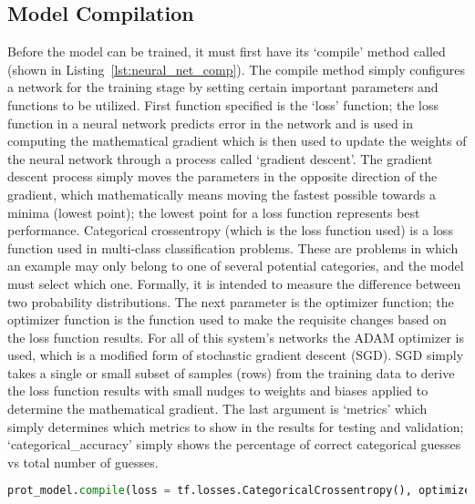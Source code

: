 \documentclass[12pt,letterpaper,oneside,reqno]{book}
\theoremstyle{plain}
\theoremstyle{definition}
\theoremstyle{plain}
\theoremstyle{remark}
\theoremstyle{plain}
\theoremstyle{definition}
\theoremstyle{plain}
\begin{document}
\subsection{Model Compilation}
Before the model can be trained, it must first have its `compile' method called (shown in Listing~\ref{lst:neural_net_comp}). The compile method simply configures a network for the training stage by setting certain important parameters and functions to be utilized. First function specified is the `loss' function; the loss function in a neural network predicts error in the network and is used in computing the mathematical gradient which is then used to update the weights of the neural network through a process called `gradient descent'. The gradient descent process simply moves the parameters in the opposite direction of the gradient, which mathematically means moving the fastest possible towards a minima (lowest point); the lowest point for a loss function represents best performance. Categorical crossentropy (which is the loss function used) is a loss function used in multi-class classification problems. These are problems in which an example may only belong to one of several potential categories, and the model must select which one.
Formally, it is intended to measure the difference between two probability distributions. The next parameter is the optimizer function; the optimizer function is the function used to make the requisite changes based on the loss function results. For all of this system's networks the ADAM optimizer is used, which is a modified form of stochastic gradient descent (SGD). SGD simply takes a single or small subset of samples (rows) from the training data to derive the loss function results with small nudges to weights and biases applied to determine the mathematical gradient. The last argument is `metrics' which simply determines which metrics to show in the results for testing and validation; `categorical\_accuracy' simply shows the percentage of correct categorical guesses vs total number of guesses. 
\begin{lstlisting}[language=Python, caption={Neural Network Compilation Code}, label=lst:neural_net_comp, frame=single]
prot_model.compile(loss = tf.losses.CategoricalCrossentropy(), optimizer=tf.optimizers.Adam(), metrics=['categorical_accuracy'])
\end{lstlisting}
\end{document}
